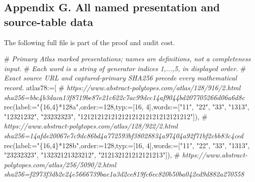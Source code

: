 \documentclass[
  10pt,
  letterpaper,
]{article}
\newenvironment{Shaded}{}{}
\newcommand{\CommentTok}[1]{\textcolor[rgb]{0.38,0.63,0.69}{\textit{#1}}}
\newcommand{\ExtensionTok}[1]{#1}
\newcommand{\FloatTok}[1]{\textcolor[rgb]{0.25,0.63,0.44}{#1}}
\newcommand{\NormalTok}[1]{#1}
\newcommand{\OperatorTok}[1]{\textcolor[rgb]{0.40,0.40,0.40}{#1}}
\newcommand{\StringTok}[1]{\textcolor[rgb]{0.25,0.44,0.63}{#1}}
\newcommand{\VariableTok}[1]{\textcolor[rgb]{0.10,0.09,0.49}{#1}}
\begin{document}
\subsection{Appendix G. All named presentation and source-table
data}\label{appendix-g.-all-named-presentation-and-source-table-data}

The following full file is part of the proof and audit cost.

\begin{Shaded}
\begin{Highlighting}[]
\NormalTok{\#}\CommentTok{ Primary Atlas marked presentations; names are definitions, not a completeness input.}
\NormalTok{\#}\CommentTok{ Each word is a string of generator indices 1,...,5, in displayed order.}
\NormalTok{\#}\CommentTok{ Exact source URL and captured{-}primary SHA256 precede every mathematical record.}
\VariableTok{atlas78}\OperatorTok{:=}\NormalTok{[}
\NormalTok{\#}\CommentTok{ https://www.abstract{-}polytopes.com/atlas/128/916/2.html sha256=bbc4b3daca13f8719be87e21c622c7ac99dcc14af9044bd207705266d06a6d8c}
\ExtensionTok{rec}\NormalTok{(}\VariableTok{label}\OperatorTok{:=}\StringTok{"\{16,4\}*128a"}\OperatorTok{,}\VariableTok{order}\OperatorTok{:=}\FloatTok{128}\OperatorTok{,}\VariableTok{typ}\OperatorTok{:=}\NormalTok{[}\FloatTok{16}\OperatorTok{,} \FloatTok{4}\NormalTok{]}\OperatorTok{,}\VariableTok{words}\OperatorTok{:=}\NormalTok{[}\StringTok{"11"}\OperatorTok{,} \StringTok{"22"}\OperatorTok{,} \StringTok{"33"}\OperatorTok{,} \StringTok{"1313"}\OperatorTok{,} \StringTok{"12321232"}\OperatorTok{,} \StringTok{"23232323"}\OperatorTok{,} \StringTok{"12121212121212121212121212121212"}\NormalTok{])}\OperatorTok{,}
\NormalTok{\#}\CommentTok{ https://www.abstract{-}polytopes.com/atlas/128/922/2.html sha256=14afde20067e7c9dc86bd4a772593bf38028834a97404a92f71bf2cbb83c4ced}
\ExtensionTok{rec}\NormalTok{(}\VariableTok{label}\OperatorTok{:=}\StringTok{"\{16,4\}*128b"}\OperatorTok{,}\VariableTok{order}\OperatorTok{:=}\FloatTok{128}\OperatorTok{,}\VariableTok{typ}\OperatorTok{:=}\NormalTok{[}\FloatTok{16}\OperatorTok{,} \FloatTok{4}\NormalTok{]}\OperatorTok{,}\VariableTok{words}\OperatorTok{:=}\NormalTok{[}\StringTok{"11"}\OperatorTok{,} \StringTok{"22"}\OperatorTok{,} \StringTok{"33"}\OperatorTok{,} \StringTok{"1313"}\OperatorTok{,} \StringTok{"23232323"}\OperatorTok{,} \StringTok{"13232121323212"}\OperatorTok{,} \StringTok{"212132121212121213"}\NormalTok{])}\OperatorTok{,}
\NormalTok{\#}\CommentTok{ https://www.abstract{-}polytopes.com/atlas/256/5090/2.html sha256=f2973f3db2e24e5666739bae1a3d2ce819fc6ec820b50ba042ed9d882a270558}

\end{Highlighting}
\end{Shaded}
\end{document}
